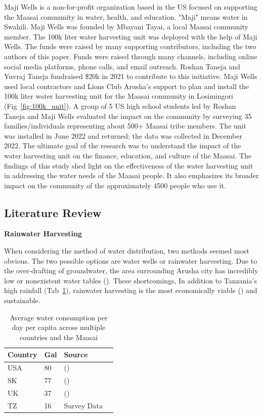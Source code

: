 \documentclass[10pt, twocolumn]{article}
\begin{document}
Maji Wells is a non-for-profit organization based in the US focused on supporting the Maasai community in water, health, and education. "Maji" means water in Swahili. Maji Wells was founded by Mbayani Tayai, a local Maasai community member. The 100k liter water harvesting unit was deployed with the help of Maji Wells. The funds were raised by many supporting contributors, including the two authors of this paper. Funds were raised through many channels, including online social media platforms, phone calls, and email outreach. Roshan Taneja and Yuvraj Taneja fundraised \$20k in 2021 to contribute to this initiative. Maji Wells used local contractors and Lions Club Arusha's support to plan and install the 100k liter water harvesting unit for the Maasai community in Losimingori (Fig~\ref{fig:100k_unit}). A group of 5 US high school students led by Roshan Taneja and Maji Wells evaluated the impact on the community by surveying 35 families/individuals representing about 500+ Maasai tribe members. The unit was installed in June 2022 and returned; the data was collected in December 2022. The ultimate goal of the research was to understand the impact of the water harvesting unit on the finance, education, and culture of the Maasai. The findings of this study shed light on the effectiveness of the water harvesting unit in addressing the water needs of the Maasai people. It also emphasizes its broader impact on the community of the approximately 4500 people who use it.

\subsection{Literature Review}

\textbf{Rainwater Harvesting}

When considering the method of water distribution, two methods seemed most obvious. The two possible options are water wells or rainwater harvesting. Due to the over-drafting of groundwater, the area surrounding Arusha city has incredibly low or nonexistent water tables (\autocite{Ongor2007}). These shortcomings, In addition to Tanzania's high rainfall (Tab~\ref{tab:water_consumption}), rainwater harvesting is the most economically viable (\autocite{TZ_Water_Harvesting}) and sustainable.

\begin{table} [H]
    \begin{tabular}{@{}llll@{}}
    \toprule
    Country & \multicolumn{1}{l}{Gal} & Source &  \\ \midrule
    USA & 80 & (\autocite{USA_Water}) &  \\
    SK & 77 & (\autocite{SK_Water}) &  \\
    UK & 37 & (\autocite{UK_Water}) &  \\
    TZ & 16& Survey Data & \\ \bottomrule
    \end{tabular}
    \caption{Average water consumption per day per capita across multiple countries and the Maasai}
    \label{tab:water_consumption}
\end{table}
\end{document}
